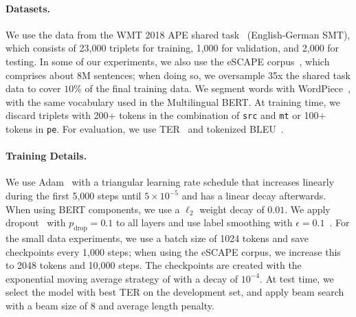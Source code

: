\paragraph*{Datasets.}
We use the data from the WMT 2018 APE shared
task~\citep{Chatterjee2018} (English-German SMT), which consists of
23,000 triplets for training, 1,000 for validation, and 2,000 for
testing. In some of our experiments, we also use the eSCAPE
corpus~\citep{negri2018escape}, which comprises about 8M sentences;
when doing so, we oversample 35x the shared task data to cover $10\%$
of the final training data. We segment words with
WordPiece~\citep{wu2016google}, with the same vocabulary used in the
Multilingual BERT. At training time, we discard triplets with 200+
tokens in the combination of {\tt src} and {\tt mt} or 100+ tokens in
  {\tt pe}. For evaluation, we use TER~\citep{snover2006study} and
tokenized BLEU~\citep{papineni2002bleu}.

\paragraph*{Training Details.}
We use Adam~\citep{kingma2014adam} with a triangular learning rate
schedule that increases linearly during the first 5,000 steps until
$5\times 10^{-5}$ and has a linear decay afterwards. When using BERT
components, we use a $\ell_2$ weight decay of $0.01$. We apply
dropout~\citep{srivastava2014dropout} with $p_{\text{drop}}=0.1$ to all
layers and use label smoothing with
$\epsilon=0.1$~\citep{pereyra2017regularizing}. For the small data
experiments, we use a batch size of 1024 tokens and save checkpoints
every 1,000 steps; when using the eSCAPE corpus, we increase this to
2048 tokens and 10,000 steps. The checkpoints are created with the
exponential moving average strategy of \citet{junczys2018marian}
with a decay of $10^{-4}$. At test time, we select the model with
best TER on the development set, and apply beam search with a beam
size of 8 and average length penalty.


